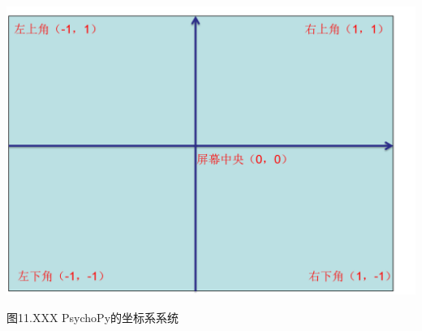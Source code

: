 \documentclass[11pt]{article}
\makeatletter
\def\maxwidth{\ifdim\Gin@nat@width>\linewidth\linewidth
    \else\Gin@nat@width\fi}
\let\Oldincludegraphics\includegraphics
\renewcommand{\includegraphics}[1]{\Oldincludegraphics[width=.8\maxwidth]{#1}}
\makeatother
\begin{document}
\includegraphics{ch11-PsychoPy的坐标系系统.png}

图11.XXX PsychoPy的坐标系系统
\end{document}
